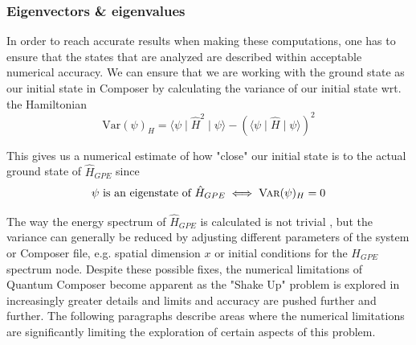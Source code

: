 \documentclass[a4paper, twocolumn]{revtex4-1}
\begin{document}
\subsubsection{Eigenvectors \& eigenvalues}

In order to reach accurate results when making these computations, one has to ensure that the states that are analyzed are described within acceptable numerical accuracy. We can ensure that we are working with the ground state as our initial state in Composer by calculating the variance of our initial state wrt. the Hamiltonian
\begin{equation}
	\text{Var}(\psi)_H = \langle \psi \mid \hat{H}^2 \mid \psi \rangle - (\langle \psi \mid \hat{H} \mid \psi \rangle)^2
\end{equation}

This gives us a numerical estimate of how "close" our initial state is to the actual ground state of $\hat{H}_{GPE}$ since
\begin{equation}
	\psi \text{ is an eigenstate of } \hat{H}_{GPE} \iff \textsc{Var}(\psi)_H = 0
\end{equation}

The way the energy spectrum of $\hat{H}_{GPE}$ is calculated is not trivial \cite{QEngine}, but the variance can generally be reduced by adjusting different parameters of the system or Composer file, e.g. spatial dimension $x$ or initial conditions for the $H_{GPE}$ spectrum node. Despite these possible fixes, the numerical limitations of Quantum Composer become apparent as the "Shake Up" problem is explored in increasingly greater details and limits and accuracy are pushed further and further. The following paragraphs describe areas where the numerical limitations are significantly limiting the exploration of certain aspects of this problem.\\
\end{document}
